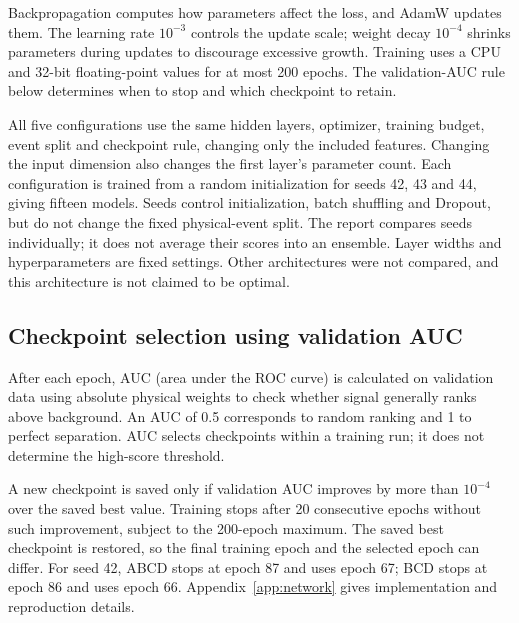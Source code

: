 \documentclass[11pt,a4paper]{article}
\begin{document}
Backpropagation computes how parameters affect the loss, and AdamW updates them.
The learning rate $10^{-3}$ controls the update scale; weight decay $10^{-4}$ shrinks parameters during updates to discourage excessive growth.
Training uses a CPU and 32-bit floating-point values for at most 200 epochs.
The validation-AUC rule below determines when to stop and which checkpoint to retain.

All five configurations use the same hidden layers, optimizer, training budget, event split and checkpoint rule, changing only the included features.
Changing the input dimension also changes the first layer's parameter count.
Each configuration is trained from a random initialization for seeds 42, 43 and 44, giving fifteen models.
Seeds control initialization, batch shuffling and Dropout, but do not change the fixed physical-event split.
The report compares seeds individually; it does not average their scores into an ensemble.
Layer widths and hyperparameters are fixed settings. Other architectures were not compared, and this architecture is not claimed to be optimal.

\subsection{Checkpoint selection using validation AUC}
After each epoch, AUC (area under the ROC curve) is calculated on validation data using absolute physical weights to check whether signal generally ranks above background.
An AUC of 0.5 corresponds to random ranking and 1 to perfect separation.
AUC selects checkpoints within a training run; it does not determine the high-score threshold.

A new checkpoint is saved only if validation AUC improves by more than $10^{-4}$ over the saved best value.
Training stops after 20 consecutive epochs without such improvement, subject to the 200-epoch maximum.
The saved best checkpoint is restored, so the final training epoch and the selected epoch can differ.
For seed 42, ABCD stops at epoch 87 and uses epoch 67; BCD stops at epoch 86 and uses epoch 66.
Appendix~\ref{app:network} gives implementation and reproduction details.
\end{document}
